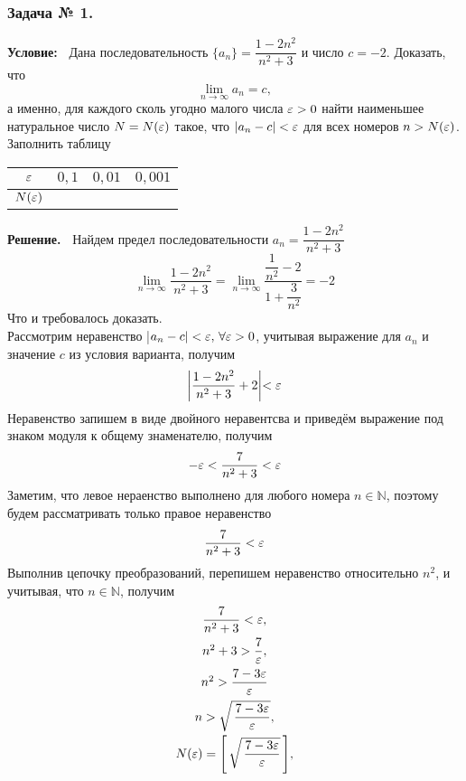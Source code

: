 \subsubsection*{\center Задача № 1.}
{\bf Условие:~}
Дана последовательность $\{a_n\} = \dfrac{1-2n^2}{n^2+3}$ и число $c=-{2}$. Доказать, что 
$$\lim\limits_{n\rightarrow\infty}a_n=c,$$
а именно, для каждого сколь угодно малого числа $\varepsilon>0$ найти наименьшее натуральное число 
$N=N(\varepsilon)$ такое, что $|a_n-c|<\varepsilon$ для всех номеров $n>N(\varepsilon)$.
Заполнить таблицу
\begin{center}
	\begin{tabular}{|c|c|c|c|}
		\hline
		$\varepsilon$ &  $0{,}1$ & $0{,}01$ & $0{,}001$ \\
		\hline
		$N(\varepsilon)$ & & & \\
		\hline
	\end{tabular}
\end{center}
{\bf Решение.~}	
Найдем предел последовательности $a_n = \dfrac{1-2n^2}{n^2+3}$
$$
\lim\limits_{n\rightarrow\infty}\dfrac{1-2n^2}{n^2+3}=\lim\limits_{n\rightarrow\infty}\dfrac{\dfrac{1}{n^2}-2}{1+\dfrac{3}{n^2}}=-{2}
$$
\hspace{1cm}
\vspace{0.5cm}
Что и требовалось доказать.\\
\hspace{0.7cm}
Рассмотрим неравенство |$a_n-c|<\varepsilon,\,\forall\varepsilon>0$, учитывая выражение для $a_n$ и значение $c$ из условия варианта,
получим
$$
\biggl|\frac{1-2n^2}{n^2+3}+2\biggl|<\varepsilon
$$
Неравенство запишем в виде двойного неравентсва и приведём выражение под знаком модуля к общему знаменателю,
получим
$$
-\varepsilon < \frac{7}{n^2+3} < \varepsilon
$$
Заметим, что левое нераенство выполнено для любого номера $n\in\mathbb{N}$, поэтому будем рассматривать только правое неравенство
$$
 \frac{7}{n^2+3} <\varepsilon
$$
Выполнив цепочку преобразований, перепишем неравенство относительно $n^2$, и учитывая, что $n\in\mathbb{N}$, получим
$$
\begin{array}{c}
\dfrac{7}{n^2+3} < \varepsilon,                               \\[8pt]
n^2+3 > \dfrac{7}{\varepsilon}, 						       \\[8pt]
n^2 > \dfrac{7-3\varepsilon}{\varepsilon}                            \\[8pt]
n > \sqrt{\,\dfrac{7-3\varepsilon}{\varepsilon}}, 		            \\[8pt]
N(\varepsilon) = \Biggl[\,\sqrt{\,\dfrac{7-3\varepsilon}{\varepsilon}}\,\Biggr],
\end{array}
$$
